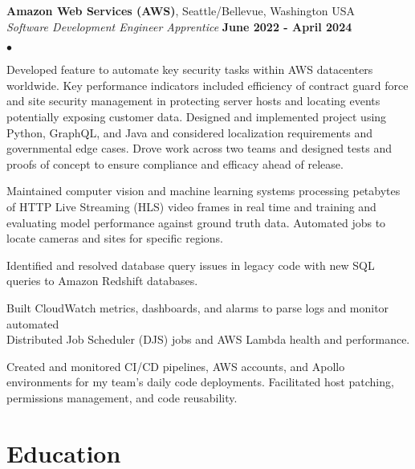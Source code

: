 \documentclass[margin,line]{res}
\newenvironment{list2}{
  \begin{list}{$\bullet$}{%
      \setlength{\itemsep}{0in}
      \setlength{\parsep}{0in} \setlength{\parskip}{0in}
      \setlength{\topsep}{0in} \setlength{\partopsep}{0in} 
      \setlength{\leftmargin}{0.2in}} \raggedright}{\end{list}}
\begin{document}
\begin{resume}
{\bf Amazon Web Services (AWS)}, Seattle/Bellevue, Washington USA \\
{\em Software Development Engineer Apprentice} \hfill {\bf June 2022 - April 2024} \\
\begin{list2}
\item Developed feature to automate key security tasks within AWS datacenters worldwide. Key performance indicators included efficiency of contract guard force and site security management in protecting server hosts and locating events potentially exposing customer data. Designed and implemented project using Python, GraphQL, and Java and considered localization requirements and governmental edge cases. Drove work across two teams and designed tests and proofs of concept to ensure compliance and efficacy ahead of release.
\item Maintained computer vision and machine learning systems processing petabytes of HTTP Live Streaming (HLS) video frames in real time and training and evaluating model performance against ground truth data. Automated jobs to locate cameras and sites for specific regions.
\item Identified and resolved database query issues in legacy code with new SQL queries to Amazon Redshift databases.
\item Built CloudWatch metrics, dashboards, and alarms to parse logs and monitor automated \\ Distributed Job Scheduler (DJS) jobs and AWS Lambda health and performance.
\item Created and monitored CI/CD pipelines, AWS accounts, and Apollo environments for my team's daily code deployments. Facilitated host patching, permissions management, and code reusability.
\end{list2}


%
%
\section{\sc Education}


\end{resume}
\end{document}
